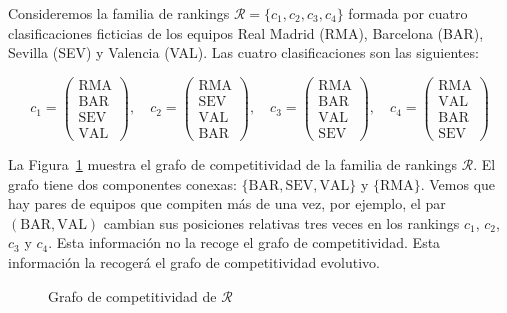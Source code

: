 \begin{ejemplo} \label{ej:grafo_competitividad}
Consideremos la familia de rankings $\mathcal{R} =\{c_1, c_2, c_3, c_4\}$ formada por cuatro clasificaciones ficticias de los equipos Real Madrid (RMA), Barcelona (BAR), Sevilla (SEV) y Valencia (VAL). Las cuatro clasificaciones son las siguientes:

\begin{equation*}
c_1 = \left( \begin{array}{c}
\text{RMA}\\
\text{BAR}\\
\text{SEV}\\
\text{VAL}
\end{array} \right), \quad
c_2 = \left( \begin{array}{c}
\text{RMA}\\
\text{SEV}\\
\text{VAL}\\
\text{BAR}
\end{array} \right), \quad
c_3 = \left( \begin{array}{c}
\text{RMA}\\
\text{BAR}\\
\text{VAL}\\
\text{SEV}
\end{array} \right), \quad
c_4 = \left( \begin{array}{c}
\text{RMA}\\
\text{VAL}\\
\text{BAR}\\
\text{SEV}
\end{array} \right)
\end{equation*}

La Figura~\ref{fig:grafo_competitividad} muestra el grafo de competitividad de la familia de rankings $\mathcal{R}$. El grafo tiene dos componentes conexas: $\{\text{BAR}, \text{SEV}, \text{VAL}\}$ y $\{\text{RMA}\}$. Vemos que hay pares de equipos que compiten más de una vez, por ejemplo, el par $(\text{BAR}, \text{VAL})$ cambian sus posiciones relativas tres veces en los rankings $c_1$, $c_2$, $c_3$ y $c_4$. Esta información no la recoge el grafo de competitividad. Esta información la recogerá el grafo de competitividad evolutivo. 

\begin{figure}[htb]
\centering
\ejemplografocompetitividad
\caption[Grafo de competitividad]{Grafo de competitividad de $\mathcal{R}$}
\label{fig:grafo_competitividad}
\end{figure}

\end{ejemplo}

